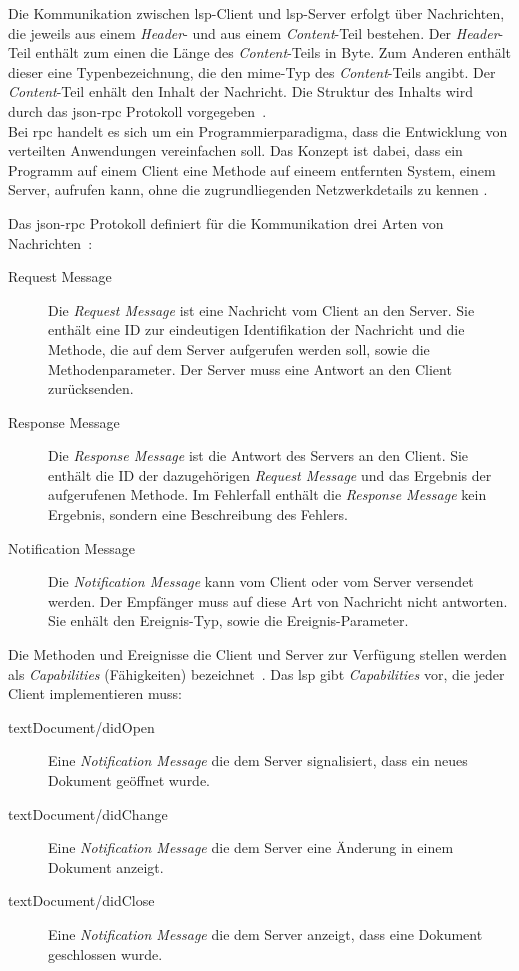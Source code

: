 Die Kommunikation zwischen \ac{lsp}-Client und \ac{lsp}-Server erfolgt über Nachrichten, die jeweils aus einem \textit{Header}- und aus einem \textit{Content}-Teil bestehen.
Der \textit{Header}-Teil enthält zum einen die Länge des \textit{Content}-Teils in Byte. Zum Anderen enthält dieser eine Typenbezeichnung,
die den \ac{mime}-Typ des \textit{Content}-Teils angibt. Der \textit{Content}-Teil enhält den Inhalt der Nachricht. Die Struktur des Inhalts wird durch
das \acs{json}-\acs{rpc} Protokoll vorgegeben~\cite{lsp-microsoft,lsp-medium}.
\\
Bei \ac{rpc} handelt es sich um ein Programmierparadigma, dass die Entwicklung von verteilten Anwendungen vereinfachen soll.
Das Konzept ist dabei, dass ein Programm auf einem Client eine Methode auf eineem entfernten System, einem Server, aufrufen kann,
ohne die zugrundliegenden Netzwerkdetails zu kennen \cite{rpc-computer-weekly}.

Das \acs{json}-\acs{rpc} Protokoll definiert für die Kommunikation drei Arten von Nachrichten~\cite{lsp-microsoft}:
\begin{description}
      \item[Request Message] Die \textit{Request Message} ist eine Nachricht vom Client an den Server.
            Sie enthält eine ID zur eindeutigen Identifikation der Nachricht und die Methode, die auf dem Server aufgerufen werden soll, sowie die Methodenparameter.
            Der Server muss eine Antwort an den Client zurücksenden.
      \item[Response Message] Die \textit{Response Message} ist die Antwort des Servers an den Client. Sie enthält die ID der dazugehörigen \textit{Request Message} und das Ergebnis der aufgerufenen Methode.
            Im Fehlerfall enthält die \textit{Response Message} kein Ergebnis, sondern eine Beschreibung des Fehlers.
      \item[Notification Message]  Die \textit{Notification Message} kann vom Client oder vom Server versendet werden.
            Der Empfänger muss auf diese Art von Nachricht nicht antworten.
            Sie enhält den Ereignis-Typ, sowie die Ereignis-Parameter.
\end{description}

Die Methoden und Ereignisse die Client und Server zur Verfügung stellen werden als \textit{Capabilities} (Fähigkeiten) bezeichnet~\cite{lsp-medium}.
Das \ac{lsp} gibt \textit{Capabilities} vor, die jeder Client implementieren muss:
\begin{description}
      \item[textDocument/didOpen] Eine \textit{Notification Message} die dem Server signalisiert, dass ein neues Dokument geöffnet wurde.
      \item[textDocument/didChange] Eine \textit{Notification Message} die dem Server eine Änderung in einem Dokument anzeigt.
      \item[textDocument/didClose]  Eine \textit{Notification Message} die dem Server anzeigt, dass eine Dokument geschlossen wurde.
\end{description}

